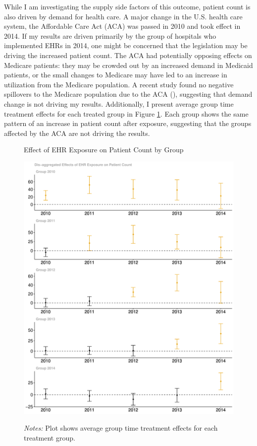 \documentclass[12pt]{article}
\begin{document}
While I am investigating the supply side factors of this outcome, patient count is also driven by demand for health care. A major change in the U.S. health care system, the Affordable Care Act (ACA) was passed in 2010 and took effect in 2014. If my results are driven primarily by the group of hospitals who implemented EHRs in 2014, one might be concerned that the legislation may be driving the increased patient count. The ACA had potentially opposing effects on Medicare patients: they may be crowded out by an increased demand in Medicaid patients, or the small changes to Medicare may have led to an increase in utilization from the Medicare population. A recent study found no negative spillovers to the Medicare population due to the ACA (\cite{carey2020impact}), suggesting that demand change is not driving my results. Additionally, I present average group time treatment effects for each treated group in Figure \ref{fig:patientgroup}. Each group shows the same pattern of an increase in patient count after exposure, suggesting that the groups affected by the ACA are not driving the results. 

\begin{figure}[ht!]
    \centering
    \captionsetup{width=.6\linewidth}
    \caption{Effect of EHR Exposure on Patient Count by Group}
    \includegraphics[scale=.47]{Objects/patient_group.pdf}
    \label{fig:patientgroup}
    \vspace{2mm}
    \caption*{\footnotesize{\textit{Notes:} Plot shows average group time treatment effects for each treatment group.}}
\end{figure}
\end{document}
